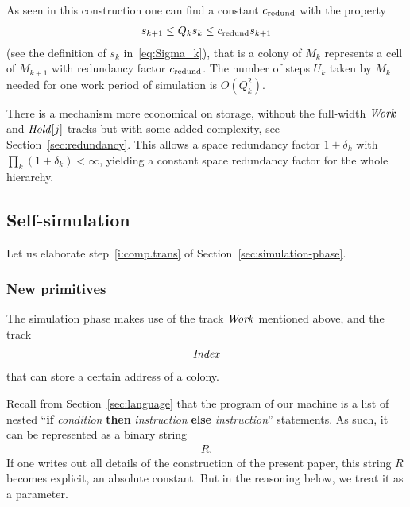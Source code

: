 \documentclass[11pt]{memoir}
\theoremstyle{definition} %
\renewcommand{\le}{\leq}
\newcommand{\fld}[1]{\ensuremath{\textit{#1\/}}}
\def\U{U}
\newcommand{\Q}{Q} %
\newcommand{\Hold}{\fld{Hold}}
\newcommand{\Index}{\fld{Index}}
\newcommand{\Work}{\fld{Work}} %
\newcommand{\cns}[1]{c_{\textrm{\upshape #1}}}
\newcommand{\CRedund}{\cns{redund}}
\begin{document}
As seen in this construction one can find a constant \( \CRedund \) with the property
\begin{align}\label{eq:redund}
    s_{k+1}\le\Q_{k}s_{k}\le \CRedund s_{k+1}
\end{align}
(see the definition of \( s_{k} \) in~\eqref{eq:Sigma_k}),
that is a colony of \( M_{k} \) represents a cell of \( M_{k+1} \) with redundancy
factor \( \CRedund \).
The number of steps \( \U_{k} \) taken by \( M_{k} \) needed for one work period
of simulation is \( O(\Q_{k}^{2}) \).

\begin{remark}
  There is a mechanism more economical on storage, without the full-width
  \( \Work \) and \( \Hold[j] \) tracks but with some
  added complexity, see Section~\ref{sec:redundancy}.
  This allows a space redundancy factor \( 1+\delta_{k} \) with \( \prod_{k}(1+\delta_{k})<\infty \),
  yielding a constant space redundancy factor for the whole hierarchy.
\end{remark}


\subsection{Self-simulation}\label{sec:self-simulation}

Let us elaborate step~\ref{i:comp.trans} of Section~\ref{sec:simulation-phase}.

\subsubsection{New primitives}

The simulation phase makes use of the track \( \Work \) mentioned above, and the track
\begin{align*}
   \Index
 \end{align*}
that can store a certain address of a colony.

Recall from Section~\ref{sec:language} that the program
of our machine is a list of nested
``\textbf{if} \emph{condition} \textbf{then} \emph{instruction}
\textbf{else} \emph{instruction}''
statements.
As such, it can be represented as a binary string 
 \begin{align*}
   R.
 \end{align*}
If one writes out all details of the construction of the present paper, this string \( R \)
becomes explicit, an absolute constant.
But in the reasoning below, we treat it as a parameter.
\end{document}
